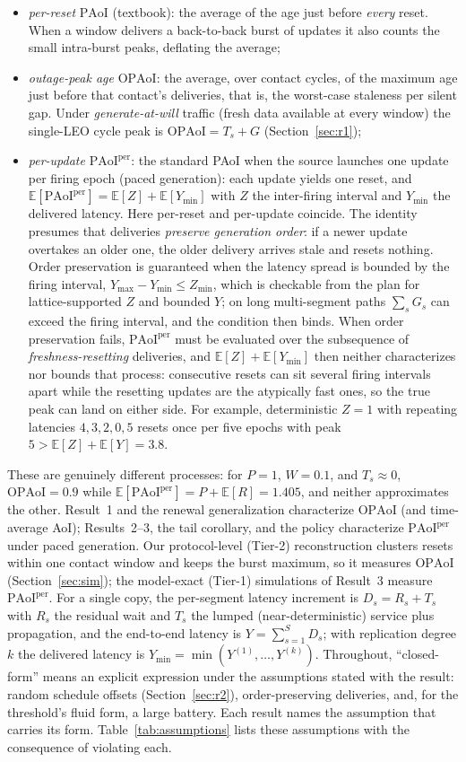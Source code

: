 \documentclass[twocolumn,3p,times,procedia]{elsarticle}
\theoremstyle{plain}
\theoremstyle{remark}
\newcommand{\PAoI}{\mathrm{PAoI}}
\newcommand{\OPAoI}{\mathrm{OPAoI}}
\newcommand{\PAoIper}{\mathrm{PAoI}^{\mathrm{per}}}
\newcommand{\E}{\mathbb{E}}
\newcommand{\Ymin}{Y_{\min}}
\begin{document}
\begin{itemize}
\item \emph{per-reset} $\PAoI$ (textbook): the average of the age just
before \emph{every} reset. When a window delivers a back-to-back burst
of updates it also counts the small intra-burst peaks, deflating the
average;
\item \emph{outage-peak age} $\OPAoI$: the average, over contact
cycles, of the maximum age just before that contact's deliveries, that
is, the worst-case staleness per silent gap. Under \emph{generate-at-will}
traffic (fresh data available at every window) the single-LEO cycle
peak is $\OPAoI=T_s+G$ (Section~\ref{sec:r1});
\item \emph{per-update} $\PAoIper$: the standard PAoI when the source
launches one update per firing epoch (paced generation): each update
yields one reset, and $\E[\PAoIper]=\E[Z]+\E[\Ymin]$ with $Z$ the
inter-firing interval and $\Ymin$ the delivered latency. Here per-reset
and per-update coincide. The identity presumes that deliveries
\emph{preserve generation order}: if a newer update overtakes an older
one, the older delivery arrives stale and resets nothing. Order
preservation is guaranteed when the latency spread is bounded by the
firing interval, $Y_{\max}-Y_{\min}\le Z_{\min}$, which is checkable
from the plan for lattice-supported $Z$ and bounded $Y$; on long
multi-segment paths $\sum_s G_s$ can exceed the firing interval, and the
condition then binds. When order preservation fails, $\PAoIper$ must be
evaluated over the subsequence of \emph{freshness-resetting}
deliveries, and $\E[Z]+\E[\Ymin]$ then neither characterizes nor
bounds that process: consecutive resets can sit several firing
intervals apart while the resetting updates are the atypically fast
ones, so the true peak can land on either side. For example,
deterministic $Z{=}1$ with repeating latencies $4,3,2,0,5$ resets once
per five epochs with peak $5>\E[Z]{+}\E[Y]{=}3.8$.
\end{itemize}
These are genuinely different processes: for $P{=}1$, $W{=}0.1$, and
$T_s{\approx}0$, $\OPAoI=0.9$ while $\E[\PAoIper]=P+\E[R]=1.405$, and
neither approximates the other.
Result~1 and the renewal generalization characterize $\OPAoI$ (and
time-average AoI); Results~2--3, the tail corollary, and the policy
characterize $\PAoIper$ under paced generation. Our protocol-level
(Tier-2) reconstruction clusters resets within one contact window and
keeps the burst maximum, so it measures $\OPAoI$
(Section~\ref{sec:sim}); the model-exact (Tier-1) simulations of
Result~3 measure $\PAoIper$. For a single copy, the per-segment latency
increment is $D_s=R_s+T_s$ with $R_s$ the residual wait and $T_s$ the
lumped (near-deterministic) service plus propagation, and the end-to-end
latency is $Y=\sum_{s=1}^S D_s$; with replication degree $k$ the delivered
latency is $\Ymin=\min(Y^{(1)},\dots,Y^{(k)})$. Throughout,
``closed-form'' means an explicit expression under the assumptions
stated with the result: random schedule offsets
(Section~\ref{sec:r2}), order-preserving deliveries, and, for the
threshold's fluid form, a large battery. Each result names the
assumption that carries its form. Table~\ref{tab:assumptions} lists
these assumptions with the consequence of violating each.
\end{document}
